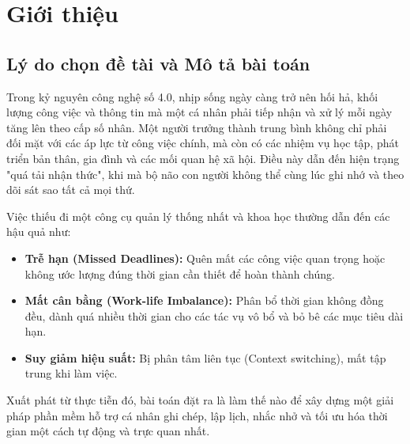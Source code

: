 \section{Giới thiệu}

\subsection{Lý do chọn đề tài và Mô tả bài toán}
Trong kỷ nguyên công nghệ số 4.0, nhịp sống ngày càng trở nên hối hả, khối lượng công việc và thông tin mà một cá nhân phải tiếp nhận và xử lý mỗi ngày tăng lên theo cấp số nhân. Một người trưởng thành trung bình không chỉ phải đối mặt với các áp lực từ công việc chính, mà còn có các nhiệm vụ học tập, phát triển bản thân, gia đình và các mối quan hệ xã hội. Điều này dẫn đến hiện trạng "quá tải nhận thức", khi mà bộ não con người không thể cùng lúc ghi nhớ và theo dõi sát sao tất cả mọi thứ.

Việc thiếu đi một công cụ quản lý thống nhất và khoa học thường dẫn đến các hậu quả như:
\begin{itemize}
    \item \textbf{Trễ hạn (Missed Deadlines):} Quên mất các công việc quan trọng hoặc không ước lượng đúng thời gian cần thiết để hoàn thành chúng.
    \item \textbf{Mất cân bằng (Work-life Imbalance):} Phân bổ thời gian không đồng đều, dành quá nhiều thời gian cho các tác vụ vô bổ và bỏ bê các mục tiêu dài hạn.
    \item \textbf{Suy giảm hiệu suất:} Bị phân tâm liên tục (Context switching), mất tập trung khi làm việc.
\end{itemize}

Xuất phát từ thực tiễn đó, bài toán đặt ra là làm thế nào để xây dựng một giải pháp phần mềm hỗ trợ cá nhân ghi chép, lập lịch, nhắc nhở và tối ưu hóa thời gian một cách tự động và trực quan nhất.

